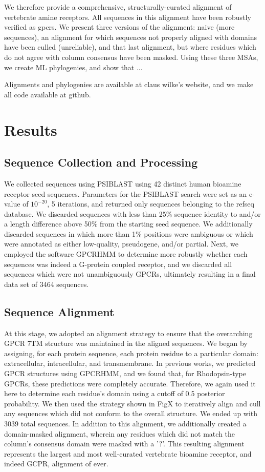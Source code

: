 \documentclass[fleqn,10pt]{wlpeerj}
\begin{document}
We therefore provide a comprehensive, structurally-curated alignment of vertebrate amine receptors. All sequences in this alignment have been robustly verified as gpcrs. We present three versions of the alignment: naive (more sequences), an alignment for which sequences not properly aligned with domains have been culled (unreliable), and that last alignment, but where residues which do not agree with column consensus have been masked. Using these three MSAs, we create ML phylogenies, and show that ...

Alignments and phylogenies are available at claus wilke's website, and we make all code available at github.


\section*{Results}

\subsection*{Sequence Collection and Processing}
We collected sequences using PSIBLAST using 42 distinct human bioamine receptor seed sequences. Parameters for the PSIBLAST search were set as an e-value of $10^{-20}$, 5 iterations, and returned only sequences belonging to the refseq database. We discarded sequences with less than 25\% sequence identity to and/or a length difference above 50\% from the starting seed sequence. We additionally discarded sequences in which more than 1\% positions were ambiguous or which were annotated as either low-quality, pseudogene, and/or partial. Next, we employed the software GPCRHMM to determine more robustly whether each sequences was indeed a G-protein coupled receptor, and we discarded all sequences which were not unambiguously GPCRs, ultimately resulting in a final data set of 3464 sequences.


\subsection*{Sequence Alignment}
 
At this stage, we adopted an alignment strategy to ensure that the overarching GPCR 7TM structure was maintained in the aligned sequences. We began by assigning, for each protein sequence, each protein residue to a particular domain: extracellular, intracellular, and transmembrane. In previous works, we predicted GPCR structures using GPCRHMM, and we found that, for Rhodopsin-type GPCRs, these predictions were completely accurate. Therefore, we again used it here to determine each residue's domain using a cutoff of 0.5 posterior probability. We then used the strategy shown in FigX to iteratively align and cull any sequences which did not conform to the overall structure. We ended up with 3039 total sequences. In addition to this alignment, we additionally created a domain-masked alignment, wherein any residues which did not match the column's consensus domain were masked with a '?'. This resulting alignment represents the largest and most well-curated vertebrate bioamine receptor, and indeed GCPR, alignment of ever.
\end{document}
